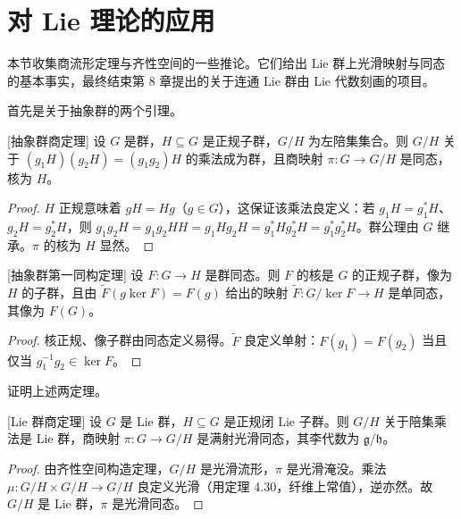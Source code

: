 \documentclass[../../main.tex]{subfiles}
\begin{document}
\section{对 Lie 理论的应用}\label{section:ch21-applications-lie-theory}

本节收集商流形定理与齐性空间的一些推论。它们给出 Lie 群上光滑映射与同态的基本事实，最终结束第 8 章提出的关于连通 Lie 群由 Lie 代数刻画的项目。

首先是关于抽象群的两个引理。

\begin{theorem}{[抽象群商定理]}\label{theorem:ch21-抽象群商}
设 $G$ 是群，$H\subseteq G$ 是正规子群，$G/H$ 为左陪集集合。则 $G/H$ 关于 $(g_1H)(g_2H)=(g_1g_2)H$ 的乘法成为群，且商映射 $\pi\colon G\to G/H$ 是同态，核为 $H$。
\end{theorem}

\begin{proof}
$H$ 正规意味着 $gH=Hg$（$g\in G$），这保证该乘法良定义：若 $g_1H=g_1^\ast H$、$g_2H=g_2^\ast H$，则 $g_1g_2H=g_1g_2HH=g_1H g_2H=g_1^\ast H g_2^\ast H=g_1^\ast g_2^\ast H$。群公理由 $G$ 继承。$\pi$ 的核为 $H$ 显然。
\end{proof}

\begin{theorem}{[抽象群第一同构定理]}\label{theorem:ch21-抽象群第一同构}
设 $F\colon G\to H$ 是群同态。则 $F$ 的核是 $G$ 的正规子群，像为 $H$ 的子群，且由 $\widetilde F(g\ker F)=F(g)$ 给出的映射 $\widetilde F\colon G/\ker F\to H$ 是单同态，其像为 $F(G)$。
\end{theorem}

\begin{proof}
核正规、像子群由同态定义易得。$\widetilde F$ 良定义单射：$F(g_1)=F(g_2)$ 当且仅当 $g_1^{-1}g_2\in\ker F$。
\end{proof}

\begin{exercise}\label{exercise:ch21-抽象群定理证明}
证明上述两定理。
\end{exercise}

\begin{theorem}{[Lie 群商定理]}\label{theorem:ch21-Lie群商}
设 $G$ 是 Lie 群，$H\subseteq G$ 是正规闭 Lie 子群。则 $G/H$ 关于陪集乘法是 Lie 群，商映射 $\pi\colon G\to G/H$ 是满射光滑同态，其李代数为 $\mathfrak g/\mathfrak h$。
\end{theorem}

\begin{proof}
由齐性空间构造定理，$G/H$ 是光滑流形，$\pi$ 是光滑淹没。乘法 $\mu\colon G/H\times G/H\to G/H$ 良定义光滑（用定理 4.30，纤维上常值），逆亦然。故 $G/H$ 是 Lie 群，$\pi$ 是光滑同态。
\end{proof}
\end{document}
